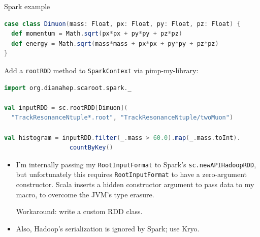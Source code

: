 \documentclass{beamer}
\begin{document}
\begin{frame}[fragile]{Spark example}
\begin{minipage}{1.1\linewidth}
\begin{lstlisting}[language=scala]
case class Dimuon(mass: Float, px: Float, py: Float, pz: Float) {
  def momentum = Math.sqrt(px*px + py*py + pz*pz)
  def energy = Math.sqrt(mass*mass + px*px + py*py + pz*pz)
}
\end{lstlisting}

Add a {\tt rootRDD} method to {\tt SparkContext} via pimp-my-library:

\begin{lstlisting}[language=scala]
import org.dianahep.scaroot.spark._

val inputRDD = sc.rootRDD[Dimuon](
  "TrackResonanceNtuple*.root", "TrackResonanceNtuple/twoMuon")

val histogram = inputRDD.filter(_.mass > 60.0).map(_.mass.toInt).
                  countByKey()
\end{lstlisting}
\end{minipage}

\begin{itemize}
\item I'm internally passing my {\tt RootInputFormat} to Spark's {\tt sc.newAPIHadoopRDD}, but unfortunately this requires {\tt RootInputFormat} to have a zero-argument constructor. Scala inserts a hidden constructor argument to pass data to my macro, to overcome the JVM's type erasure.

Workaround: write a custom RDD class.
\item Also, Hadoop's serialization is ignored by Spark; use Kryo.
\end{itemize}
\end{frame}
\end{document}
